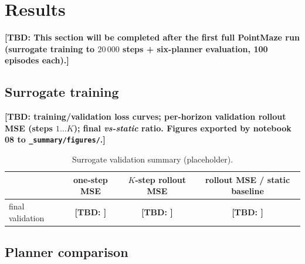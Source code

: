 \documentclass[11pt,a4paper]{article}
\newcommand{\TBD}[1]{\textcolor{red!70!black}{\textbf{[TBD: #1]}}}
\begin{document}
\section{Results}
\label{sec:results}

\TBD{This section will be completed after the first full PointMaze run
(surrogate training to $20\,000$ steps + six-planner evaluation, 100 episodes
each).}

\subsection{Surrogate training}
\label{sec:results-surrogate}

\TBD{training/validation loss curves; per-horizon validation rollout MSE
(steps $1\ldots K$); final \emph{vs-static} ratio. Figures exported by
notebook 08 to \texttt{\_summary/figures/}.}

\begin{table}[h]
\centering
\small
\begin{tabular}{@{}lccc@{}}
\toprule
 & one-step MSE & $K$-step rollout MSE & rollout MSE / static baseline \\
\midrule
final validation & \TBD{} & \TBD{} & \TBD{} \\
\bottomrule
\end{tabular}
\caption{Surrogate validation summary (placeholder).}
\label{tab:surrogate}
\end{table}

\subsection{Planner comparison}
\label{sec:results-planners}
\end{document}
